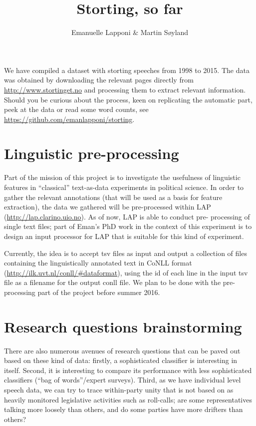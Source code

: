 \documentclass[12pt,a4paper]{article}
\begin{document}
\title{Storting, so far}
\author{Emanuelle Lapponi \& Martin S{\o}yland}
\maketitle
We have compiled a dataset with storting speeches from 1998 to 2015. The data was obtained by downloading the relevant pages directly from \url{http://www.stortinget.no} and processing them to extract relevant information. Should you be curious about the process, keen on replicating the automatic part, peek at the data or read some word counts, see \url{https://github.com/emanlapponi/storting}.


\section{Linguistic pre-processing}
Part of the mission of this project is to investigate the usefulness of linguistic features in ``classical'' text-as-data experiments in political science. In order to gather the relevant annotations (that will be used as a basis for feature extraction), the data we gathered will be pre-processed within LAP (\url{http://lap.clarino.uio.no}). As of now, LAP is able to conduct pre- processing of single text files; part of Eman's PhD work in the context of this experiment is to design an input processor for LAP that is suitable for this kind of experiment. 

Currently, the idea is to accept tsv files as input and output a collection of files containing the linguistically annotated text in CoNLL format (\url{http://ilk.uvt.nl/conll/\#dataformat}), using the id of each line in the input tsv file as a filename for the output conll file. We plan to be done with the pre-processing part of the project before summer 2016.  

\section{Research questions brainstorming}
There are also numerous avenues of research questions that can be paved out based on these kind of data: firstly, a sophisticated classifier is interesting in itself. Second, it is interesting to compare its performance with less sophisticated classifiers (``bag of words''/expert surveys). Third, as we have individual level speech data, we can try to trace within-party unity that is not based on as heavily monitored legislative activities such as roll-calls; are some representatives talking more loosely than others, and do some parties have more drifters than others? 
\end{document}
